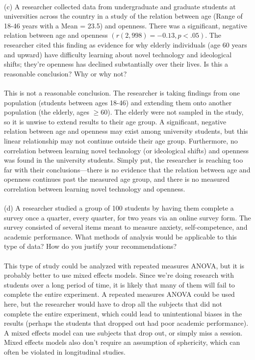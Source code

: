 \documentclass[onecolumn,10pt]{jhwhw}
\begin{document}
\\
(c) A researcher collected data from undergraduate and graduate students at universities across the country in a study of the relation between age (Range of 18-46 years with a Mean = 23.5) and openness. There was a significant, negative relation between age and openness $(r(2,998) = -0.13, p < .05)$. The researcher cited this finding as evidence for why elderly individuals (age 60 years and upward) have difficulty learning about novel technology and ideological shifts; they're openness has declined substantially over their lives. Is this a reasonable conclusion? Why or why not?\\
\\
This is not a reasonable conclusion. The researcher is taking findings from one population (students between ages 18-46) and extending them onto another population (the elderly, ages $\geq60$). The elderly were not sampled in the study, so it is unwise to extend results to their age group. A significant, negative relation between age and openness may exist among university students, but this linear relationship may not continue outside their age group. Furthermore, no correlation between learning novel technology (or ideological shifts) and openness was found in the university students. Simply put, the researcher is reaching too far with their conclusions---there is no evidence that the relation between age and openness continues past the measured age group, and there is no measured correlation between learning novel technology and openness.\\
\\
(d) A researcher studied a group of 100 students by having them complete a survey once a quarter, every quarter, for two years via an online survey form. The survey consisted of several items meant to measure anxiety, self-competence, and academic performance. What methods of analysis would be applicable to this type of data? How do you justify your recommendations?\\
\\
This type of study could be analyzed with repeated measures ANOVA, but it is probably better to use mixed effects models. Since we're doing research with students over a long period of time, it is likely that many of them will fail to complete the entire experiment. A repeated measures ANOVA could be used here, but the researcher would have to drop all the subjects that did not complete the entire experiment, which could lead to unintentional biases in the results (perhaps the students that dropped out had poor academic performance). A mixed effects model can use subjects that drop out, or simply miss a session. Mixed effects models also don't require an assumption of sphericity, which can often be violated in longitudinal studies.\\
\end{document}
